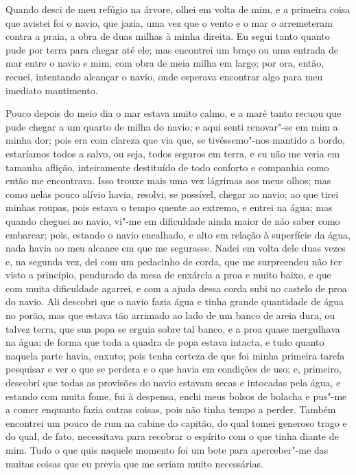 Quando desci de meu refúgio na árvore, olhei em volta de mim, e a
primeira coisa que avistei foi o navio, que jazia, uma vez que o vento e
o mar o arremeteram contra a praia, a obra de duas milhas à minha
direita. Eu segui tanto quanto pude por terra para chegar até ele; mas
encontrei um braço ou uma entrada de mar entre o navio e mim, com obra
de meia milha em largo; por ora, então, recuei, intentando alcançar o
navio, onde esperava encontrar algo para meu imediato mantimento.

Pouco depois do meio dia o mar estava muito calmo, e a maré tanto recuou
que pude chegar a um quarto de milha do navio; e aqui senti renovar"-se
em mim a minha dor; pois era com clareza que via que, se tivéssemo"-nos
mantido a bordo, estaríamos todos a salvo, ou seja, todos seguros em
terra, e eu não me veria em tamanha aflição, inteiramente destituído de
todo conforto e companhia como então me encontrava. Isso trouxe mais uma
vez lágrimas aos meus olhos; mas como nelas pouco alívio havia, resolvi,
se possível, chegar ao navio; ao que tirei minhas roupas, pois estava o
tempo quente ao extremo, e entrei na água; mas quando cheguei ao navio,
vi"-me em dificuldade ainda maior de não saber como embarcar; pois,
estando o navio encalhado, e alto em relação à superfície da água, nada
havia ao meu alcance em que me segurasse. Nadei em volta dele duas vezes
e, na segunda vez, dei com um pedacinho de corda, que me surpreendeu não
ter visto a princípio, pendurado da mesa de enxárcia a proa e muito
baixo, e que com muita dificuldade agarrei, e com a ajuda dessa corda
subi no castelo de proa do navio. Ali descobri que o navio fazia água e
tinha grande quantidade de água no porão, mas que estava tão arrimado ao
lado de um banco de areia dura, ou talvez terra, que sua popa se erguia
sobre tal banco, e a proa quase mergulhava na água; de forma que toda a
quadra de popa estava intacta, e tudo quanto naquela parte havia,
enxuto; pois tenha certeza de que foi minha primeira tarefa pesquisar e
ver o que se perdera e o que havia em condições de uso; e, primeiro,
descobri que todas as provisões do navio estavam secas e intocadas pela
água, e estando com muita fome, fui à despensa, enchi meus bolsos de
bolacha e pus"-me a comer enquanto fazia outras coisas, pois não tinha
tempo a perder. Também encontrei um pouco de rum na cabine do capitão,
do qual tomei generoso trago e do qual, de fato, necessitava para
recobrar o espírito com o que tinha diante de mim. Tudo o que quis
naquele momento foi um bote para aperceber"-me das muitas coisas que eu
previa que me seriam muito necessárias.

